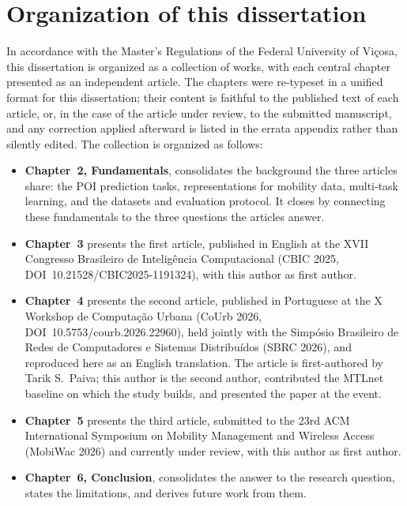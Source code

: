 \section{Organization of this dissertation}
\label{sec:intro:organization}

In accordance with the Master's Regulations of the Federal University of Vi\c{c}osa,
this dissertation is organized as a collection of works, with each central chapter
presented as an independent article. The chapters were re-typeset in a unified format
for this dissertation; their content is faithful to the published text of each
article, or, in the case of the article under review, to the submitted manuscript, and
any correction applied afterward is listed in the errata appendix rather than silently
edited. The collection is organized as follows:

\begin{itemize}
  \item \textbf{Chapter~2, Fundamentals}, consolidates the background the three
        articles share: the POI prediction tasks, representations for mobility data,
        multi-task learning, and the datasets and evaluation protocol. It closes by
        connecting these fundamentals to the three questions the articles answer.
  \item \textbf{Chapter~3} presents the first article, published in English at the
        XVII Congresso Brasileiro de Intelig\^encia Computacional (CBIC 2025,
        DOI~10.21528/CBIC2025-1191324), with this author as first author.
  \item \textbf{Chapter~4} presents the second article, published in Portuguese at the
        X Workshop de Computa\c{c}\~ao Urbana (CoUrb 2026,
        DOI~10.5753/courb.2026.22960), held jointly with the Simp\'osio Brasileiro de
        Redes de Computadores e Sistemas Distribu\'idos (SBRC 2026), and reproduced
        here as an English translation.
        The article is first-authored by Tarik S.\ Paiva; this author is the second
        author, contributed the MTLnet baseline on which the study builds, and
        presented the paper at the event.
  \item \textbf{Chapter~5} presents the third article, submitted to the 23rd ACM
        International Symposium on Mobility Management and Wireless Access (MobiWac
        2026) and currently under review, with this author as first author.
  \item \textbf{Chapter~6, Conclusion}, consolidates the answer to the research
        question, states the limitations, and derives future work from them.
\end{itemize}

